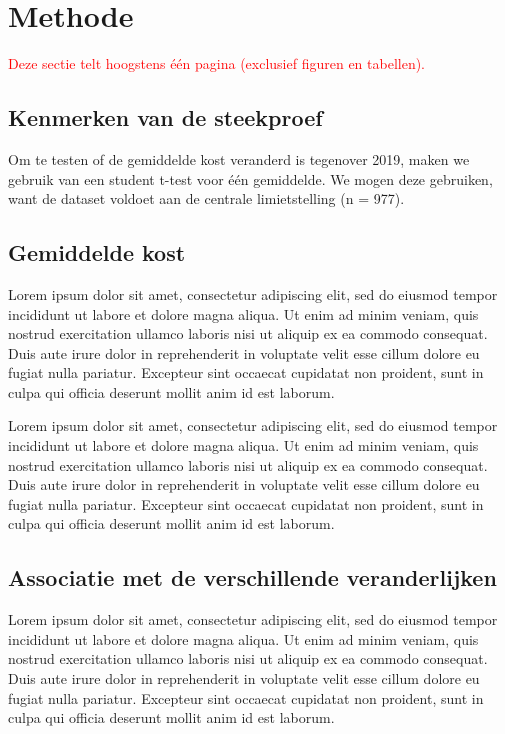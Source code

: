 \documentclass[a4paper]{kulakarticle}
\newcommand{\rood}[1]{\textcolor{red}{#1}}
\begin{document}
	\section{Methode}
	\rood{Deze sectie telt hoogstens één pagina (exclusief figuren en tabellen).}
	\subsection{Kenmerken van de steekproef}
Om te testen of de gemiddelde kost veranderd is tegenover 2019, maken we gebruik van een student t-test voor één gemiddelde. We mogen deze gebruiken, want de dataset voldoet aan de centrale limietstelling (n = 977).
	
	\subsection{Gemiddelde kost}
	
	Lorem ipsum dolor sit amet, consectetur adipiscing elit, sed do eiusmod tempor incididunt ut labore et dolore magna aliqua. Ut enim ad minim veniam, quis nostrud exercitation ullamco laboris nisi ut aliquip ex ea commodo consequat. Duis aute irure dolor in reprehenderit in voluptate velit esse cillum dolore eu fugiat nulla pariatur. Excepteur sint occaecat cupidatat non proident, sunt in culpa qui officia deserunt mollit anim id est laborum.
	
	Lorem ipsum dolor sit amet, consectetur adipiscing elit, sed do eiusmod tempor incididunt ut labore et dolore magna aliqua. Ut enim ad minim veniam, quis nostrud exercitation ullamco laboris nisi ut aliquip ex ea commodo consequat. Duis aute irure dolor in reprehenderit in voluptate velit esse cillum dolore eu fugiat nulla pariatur. Excepteur sint occaecat cupidatat non proident, sunt in culpa qui officia deserunt mollit anim id est laborum.
	
	\subsection{Associatie met de verschillende veranderlijken}
	
	Lorem ipsum dolor sit amet, consectetur adipiscing elit, sed do eiusmod tempor incididunt ut labore et dolore magna aliqua. Ut enim ad minim veniam, quis nostrud exercitation ullamco laboris nisi ut aliquip ex ea commodo consequat. Duis aute irure dolor in reprehenderit in voluptate velit esse cillum dolore eu fugiat nulla pariatur. Excepteur sint occaecat cupidatat non proident, sunt in culpa qui officia deserunt mollit anim id est laborum.
	
\end{document}
